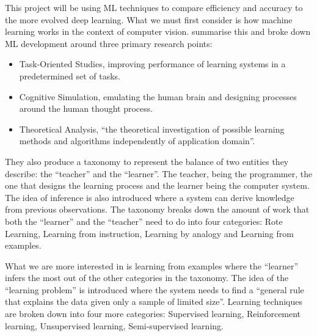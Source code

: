 \documentclass[12pt,a4paper]{report}
\begin{document}
This project will be using ML techniques to compare efficiency and accuracy to the more evolved deep learning. 
What we must first consider is how machine learning works in the context of computer vision. 
\citet{CamastraFrancescoMLfA} summarise this and broke down ML development around three primary research 
points:

\begin{itemize}
    \item Task-Oriented Studies, improving performance of learning systems in a predetermined set of tasks.
    \item Cognitive Simulation, emulating the human brain and designing processes around the human thought process.
    \item Theoretical Analysis, “the theoretical investigation of possible learning methods and algorithms 
    independently of application domain”.
\end{itemize}

They also produce a taxonomy to represent the balance of two entities they describe: the “teacher” and the “learner”. 
The teacher, being the programmer, the one that designs the learning process and the learner being the computer system. 
The idea of inference is also introduced where a system can derive knowledge from previous observations. The taxonomy 
breaks down the amount of work that both the “learner” and the “teacher” need to do into four categories: Rote Learning,
Learning from instruction, Learning by analogy and Learning from examples.

\par

What we are more interested in is learning from examples where the “learner” infers the most out of the other 
categories in the taxonomy. The idea of the “learning problem” is introduced where the system needs to find a “general 
rule that explains the data given only a sample of limited size”. Learning techniques are broken down into four more 
categories: Supervised learning, Reinforcement learning, Unsupervised learning, Semi-supervised learning.

\par
\end{document}
